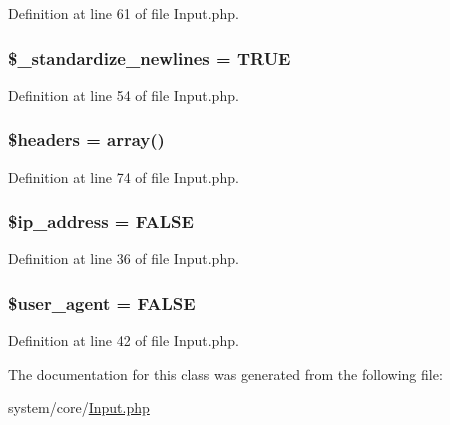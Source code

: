 Definition at line 61 of file Input.\-php.

\hypertarget{class_c_i___input_ad9ebdfce8f992b3a41aaf64ea8782933}{
\subsubsection[{\$\-\_\-standardize\-\_\-newlines}]{\setlength{\rightskip}{0pt plus 5cm}\$\-\_\-standardize\-\_\-newlines = T\-R\-U\-E}}\label{class_c_i___input_ad9ebdfce8f992b3a41aaf64ea8782933}


Definition at line 54 of file Input.\-php.

\hypertarget{class_c_i___input_a52500036ee807241b8b4b7e2367c49ef}{
\subsubsection[{\$headers}]{\setlength{\rightskip}{0pt plus 5cm}\$headers = array()\hspace{0.3cm}{\ttfamily [protected]}}}\label{class_c_i___input_a52500036ee807241b8b4b7e2367c49ef}


Definition at line 74 of file Input.\-php.

\hypertarget{class_c_i___input_a614e10d1ab6dcf06fa7fef37af7b7eee}{
\subsubsection[{\$ip\-\_\-address}]{\setlength{\rightskip}{0pt plus 5cm}\${\bf ip\-\_\-address} = F\-A\-L\-S\-E}}\label{class_c_i___input_a614e10d1ab6dcf06fa7fef37af7b7eee}


Definition at line 36 of file Input.\-php.

\hypertarget{class_c_i___input_aeea73d2dc27fea041fbcadae59f07cd5}{
\subsubsection[{\$user\-\_\-agent}]{\setlength{\rightskip}{0pt plus 5cm}\${\bf user\-\_\-agent} = F\-A\-L\-S\-E}}\label{class_c_i___input_aeea73d2dc27fea041fbcadae59f07cd5}


Definition at line 42 of file Input.\-php.



The documentation for this class was generated from the following file\-:\begin{DoxyCompactItemize}
\item 
system/core/\hyperlink{_input_8php}{Input.\-php}\end{DoxyCompactItemize}
